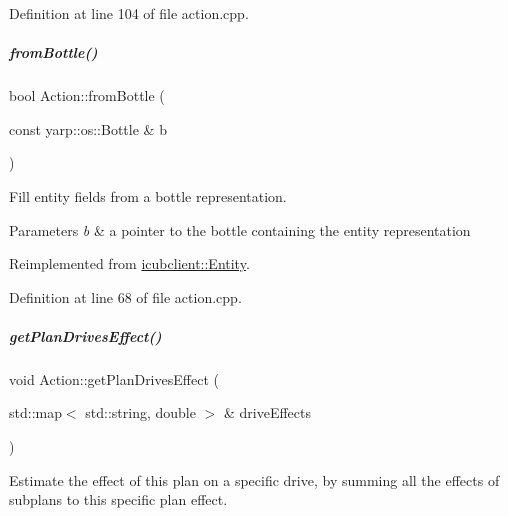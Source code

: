 Definition at line 104 of file action.\+cpp.

\mbox{\label{group__icubclient__representations_a5bde40cd7f11badb7d61b70e51fe18c0}} 
\subparagraph{\texorpdfstring{from\+Bottle()}{fromBottle()}}
{\footnotesize\ttfamily bool Action\+::from\+Bottle (\begin{DoxyParamCaption}\item[{const yarp\+::os\+::\+Bottle \&}]{b }\end{DoxyParamCaption})\hspace{0.3cm}{\ttfamily [virtual]}}



Fill entity fields from a bottle representation. 


\begin{DoxyParams}{Parameters}
{\em b} & a pointer to the bottle containing the entity representation \\
\hline
\end{DoxyParams}


Reimplemented from \hyperlink{group__icubclient__representations_aba7fbff7372e12c9eacf7f458ba66478}{icubclient\+::\+Entity}.



Definition at line 68 of file action.\+cpp.

\mbox{\label{group__icubclient__representations_a627e81e6a323fe17c1a240d3a06f9a75}} 
\subparagraph{\texorpdfstring{get\+Plan\+Drives\+Effect()}{getPlanDrivesEffect()}}
{\footnotesize\ttfamily void Action\+::get\+Plan\+Drives\+Effect (\begin{DoxyParamCaption}\item[{std\+::map$<$ std\+::string, double $>$ \&}]{drive\+Effects }\end{DoxyParamCaption})\hspace{0.3cm}{\ttfamily [virtual]}}



Estimate the effect of this plan on a specific drive, by summing all the effects of subplans to this specific plan effect. 



